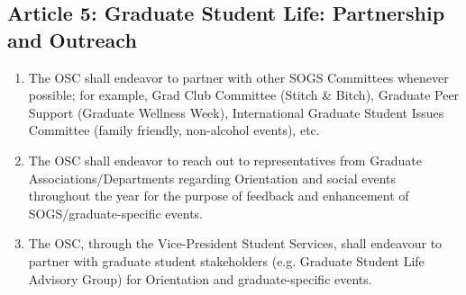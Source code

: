 \subsection{Article 5: Graduate Student Life: Partnership and Outreach}
\begin{enumerate}[label*=\arabic*., align=left]	
\item The OSC shall endeavor to partner with other SOGS Committees whenever possible; for example, Grad Club Committee (Stitch \& Bitch), Graduate Peer Support (Graduate Wellness Week), International Graduate Student Issues Committee (family friendly, non-alcohol events), etc.
\item The OSC shall endeavor to reach out to representatives from Graduate Associations/Departments regarding Orientation and social events throughout the year for the purpose of feedback and enhancement of SOGS/graduate-specific events.
\item The OSC, through the Vice-President Student Services, shall endeavour to partner with graduate student stakeholders (e.g. Graduate Student Life Advisory Group) for Orientation and graduate-specific events.
\end{enumerate}
